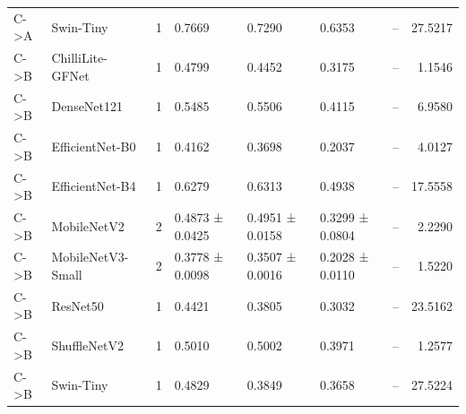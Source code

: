 \begin{tabular}{llrllllr}
C->A & Swin-Tiny & 1 & 0.7669 & 0.7290 & 0.6353 & -- & 27.5217 \\
C->B & ChilliLite-GFNet & 1 & 0.4799 & 0.4452 & 0.3175 & -- & 1.1546 \\
C->B & DenseNet121 & 1 & 0.5485 & 0.5506 & 0.4115 & -- & 6.9580 \\
C->B & EfficientNet-B0 & 1 & 0.4162 & 0.3698 & 0.2037 & -- & 4.0127 \\
C->B & EfficientNet-B4 & 1 & 0.6279 & 0.6313 & 0.4938 & -- & 17.5558 \\
C->B & MobileNetV2 & 2 & 0.4873 ± 0.0425 & 0.4951 ± 0.0158 & 0.3299 ± 0.0804 & -- & 2.2290 \\
C->B & MobileNetV3-Small & 2 & 0.3778 ± 0.0098 & 0.3507 ± 0.0016 & 0.2028 ± 0.0110 & -- & 1.5220 \\
C->B & ResNet50 & 1 & 0.4421 & 0.3805 & 0.3032 & -- & 23.5162 \\
C->B & ShuffleNetV2 & 1 & 0.5010 & 0.5002 & 0.3971 & -- & 1.2577 \\
C->B & Swin-Tiny & 1 & 0.4829 & 0.3849 & 0.3658 & -- & 27.5224 \\
\bottomrule
\end{tabular}
